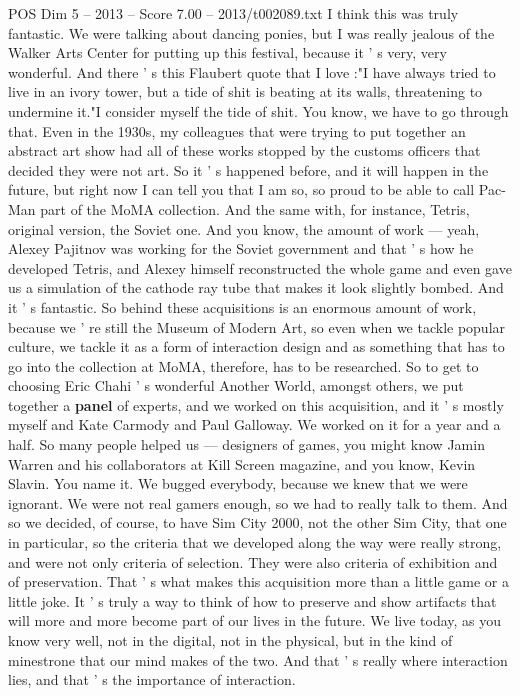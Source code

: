 \begin{textsample}{POS Dim 5 – 2013 – Score 7.00 – 2013/t002089.txt}
I think this was truly fantastic.
We were talking about dancing ponies, but I was really jealous of the Walker Arts Center for putting up this festival, because it ' s very, very wonderful.
And there ' s this Flaubert quote that I love :"I have always tried to live in an ivory tower, but a tide of shit is beating at its walls, threatening to undermine it."I consider myself the tide of shit.
You know, we have to go through that.
Even in the 1930s, my colleagues that were trying to put together an abstract art show had all of these works stopped by the customs officers that decided they were not art.
So it ' s happened before, and it will happen in the future, but right now I can tell you that I am so, so proud to be able to call Pac-Man part of the MoMA collection.
And the same with, for instance, Tetris, original version, the Soviet one.
And you know, the amount of work — yeah, Alexey Pajitnov was working for the Soviet government and that ' s how he developed Tetris, and Alexey himself reconstructed the whole game and even gave us a simulation of the cathode ray tube that makes it look slightly bombed.
And it ' s fantastic.
So behind these acquisitions is an enormous amount of work, because we ' re still the Museum of Modern Art, so even when we tackle popular culture, we tackle it as a form of interaction design and as something that has to go into the collection at MoMA, therefore, has to be researched.
So to get to choosing Eric Chahi ' s wonderful Another World, amongst others, we put together a \textbf{panel} of experts, and we worked on this acquisition, and it ' s mostly myself and Kate Carmody and Paul Galloway.
We worked on it for a year and a half.
So many people helped us — designers of games, you might know Jamin Warren and his collaborators at Kill Screen magazine, and you know, Kevin Slavin.
You name it.
We bugged everybody, because we knew that we were ignorant.
We were not real gamers enough, so we had to really talk to them.
And so we decided, of course, to have Sim City 2000, not the other Sim City, that one in particular, so the criteria that we developed along the way were really strong, and were not only criteria of selection.
They were also criteria of exhibition and of preservation.
That ' s what makes this acquisition more than a little game or a little joke.
It ' s truly a way to think of how to preserve and show artifacts that will more and more become part of our lives in the future.
We live today, as you know very well, not in the digital, not in the physical, but in the kind of minestrone that our mind makes of the two.
And that ' s really where interaction lies, and that ' s the importance of interaction.

\end{textsample}
